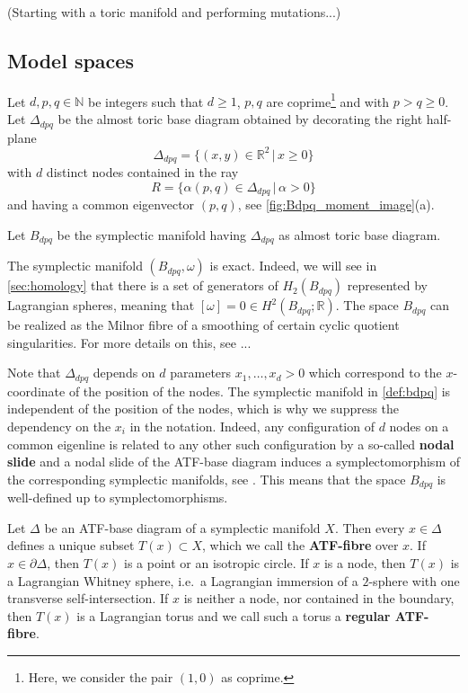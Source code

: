 \documentclass[12pt,a4paper,draft]{scrartcl}
\begin{document}
(Starting with a toric manifold and performing mutations...)



\subsection{Model spaces}

Let $d,p,q \in \mathbb{N}$ be integers such that $d≥1$,   $p,q$ are coprime\footnote{Here, we consider the pair $(1,0)$ as coprime.} and with $p>q≥0$. Let $\Delta_{dpq}$ be the almost toric base diagram obtained by decorating the right half-plane
$$\Delta_{dpq} = \{ (x,y) \in \mathbb{R}^2 \, \vert \, x \geqslant 0 \}$$
with $d$ distinct nodes contained in the ray 
\begin{equation}
  \label{eqn:eigenline}
  R = \{\alpha (p,q) \in \Delta_{dpq} \, \vert \, \alpha > 0 \}
\end{equation}
and having a common eigenvector $(p,q)$, see \cref{fig:Bdpq_moment_image}(a). 

\begin{definition}
    \label{def:bdpq}
    Let $B_{dpq}$ be the symplectic manifold having $\Delta_{dpq}$ as almost toric base diagram. 
\end{definition}

\begin{remark}
    The symplectic manifold $(B_{dpq}, \omega)$ is exact. Indeed, we will see in \cref{sec:homology} that there is a set of generators of $H_2(B_{dpq})$ represented by Lagrangian spheres, meaning that $[\omega] = 0 \in H^2(B_{dpq};\mathbb{R})$. The space $B_{dpq}$ can be realized as the Milnor fibre of a smoothing of certain cyclic quotient singularities. For more details on this, see ...
\end{remark}

Note that $\Delta_{dpq}$ depends on $d$ parameters $x_1,\ldots,x_d > 0$ which correspond to the $x$-coordinate of the position of the nodes. The symplectic manifold in \cref{def:bdpq} is independent of the position of the nodes, which is why we suppress the dependency on the $x_i$ in the notation. Indeed, any configuration of $d$ nodes on a common eigenline is related to any other such configuration by a so-called \textbf{nodal slide} and a nodal slide of the ATF-base diagram induces a symplectomorphism of the corresponding symplectic manifolds, see \cite[Theorems 8.10]{evans2021atfs}. This means that the space $B_{dpq}$ is well-defined up to symplectomorphisms.

Let $\Delta$ be an ATF-base diagram of a symplectic manifold $X$. Then every $x \in \Delta$ defines a unique subset $T(x) \subset X$, which we call the \textbf{ATF-fibre} over $x$. If $x \in \partial \Delta$, then $T(x)$ is a point or an isotropic circle. If $x$ is a node, then $T(x)$ is a Lagrangian Whitney sphere, i.e.\ a Lagrangian immersion of a $2$-sphere with one transverse self-intersection. If $x$ is neither a node, nor contained in the boundary, then $T(x)$ is a Lagrangian torus and we call such a torus a \textbf{regular ATF-fibre}.
\end{document}
